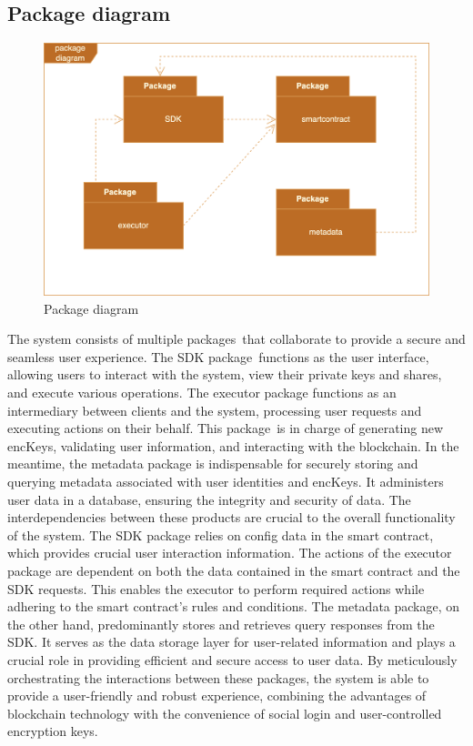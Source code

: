 \documentclass[../Main.tex]{subfiles}
\begin{document}
\subsection{Package diagram}

\begin{figure}[H]
 \centering
 \includegraphics[scale=0.17]{Figure/package-diagram.png}
 \caption{Package diagram}
    \label{fig:package-diagram}
\end{figure}
The system consists of multiple packages that collaborate to provide a secure and seamless user experience. The SDK package functions as the user interface, allowing users to interact with the system, view their private keys and shares, and execute various operations. The executor package functions as an intermediary between clients and the system, processing user requests and executing actions on their behalf. This package is in charge of generating new encKeys, validating user information, and interacting with the blockchain. In the meantime, the metadata package is indispensable for securely storing and querying metadata associated with user identities and encKeys. It administers user data in a database, ensuring the integrity and security of data. The interdependencies between these products are crucial to the overall functionality of the system. The SDK package relies on config data in the smart contract, which provides crucial user interaction information. The actions of the executor package are dependent on both the data contained in the smart contract and the SDK requests. This enables the executor to perform required actions while adhering to the smart contract's rules and conditions. The metadata package, on the other hand, predominantly stores and retrieves query responses from the SDK. It serves as the data storage layer for user-related information and plays a crucial role in providing efficient and secure access to user data. By meticulously orchestrating the interactions between these packages, the system is able to provide a user-friendly and robust experience, combining the advantages of blockchain technology with the convenience of social login and user-controlled encryption keys.
\end{document}
